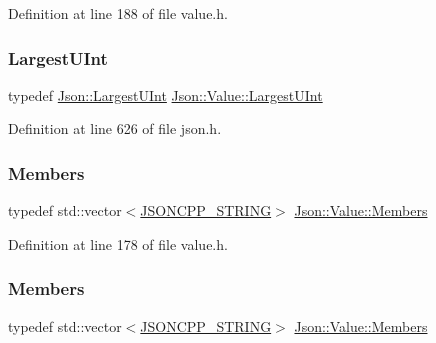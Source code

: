 Definition at line 188 of file value.\+h.

\hypertarget{class_json_1_1_value_a6682a3684d635e03fc06ba229fa24eec}{}\label{class_json_1_1_value_a6682a3684d635e03fc06ba229fa24eec} 
\subsubsection{\texorpdfstring{Largest\+U\+Int}{LargestUInt}\hspace{0.1cm}{\footnotesize\ttfamily [2/2]}}
{\footnotesize\ttfamily typedef \hyperlink{namespace_json_ae202ecad69725e23443f465e257456d0}{Json\+::\+Largest\+U\+Int} \hyperlink{class_json_1_1_value_a6682a3684d635e03fc06ba229fa24eec}{Json\+::\+Value\+::\+Largest\+U\+Int}}



Definition at line 626 of file json.\+h.

\hypertarget{class_json_1_1_value_a9ae9069983fc38f1928d76f9c79ac64d}{}\label{class_json_1_1_value_a9ae9069983fc38f1928d76f9c79ac64d} 
\subsubsection{\texorpdfstring{Members}{Members}\hspace{0.1cm}{\footnotesize\ttfamily [1/2]}}
{\footnotesize\ttfamily typedef std\+::vector$<$\hyperlink{config_8h_a1e723f95759de062585bc4a8fd3fa4be}{J\+S\+O\+N\+C\+P\+P\+\_\+\+S\+T\+R\+I\+NG}$>$ \hyperlink{class_json_1_1_value_a9ae9069983fc38f1928d76f9c79ac64d}{Json\+::\+Value\+::\+Members}}



Definition at line 178 of file value.\+h.

\hypertarget{class_json_1_1_value_a9ae9069983fc38f1928d76f9c79ac64d}{}\label{class_json_1_1_value_a9ae9069983fc38f1928d76f9c79ac64d} 
\subsubsection{\texorpdfstring{Members}{Members}\hspace{0.1cm}{\footnotesize\ttfamily [2/2]}}
{\footnotesize\ttfamily typedef std\+::vector$<$\hyperlink{config_8h_a1e723f95759de062585bc4a8fd3fa4be}{J\+S\+O\+N\+C\+P\+P\+\_\+\+S\+T\+R\+I\+NG}$>$ \hyperlink{class_json_1_1_value_a9ae9069983fc38f1928d76f9c79ac64d}{Json\+::\+Value\+::\+Members}}



